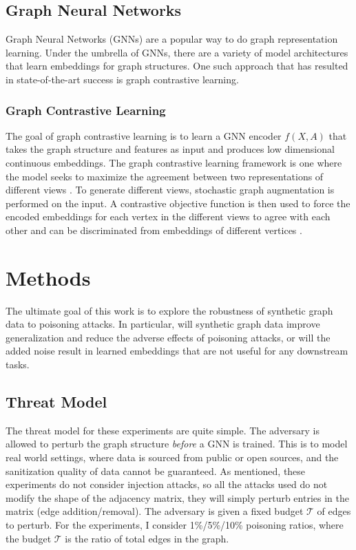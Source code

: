 \documentclass{article}
\begin{document}
\subsection{Graph Neural Networks}

Graph Neural Networks (GNNs) are a popular way to do graph representation learning. Under the umbrella of GNNs, there are a variety of model architectures that learn embeddings for graph structures. One such approach that has resulted in state-of-the-art success is graph contrastive learning.

\subsubsection{Graph Contrastive Learning}

The goal of graph contrastive learning is to learn a GNN encoder $f(X, A)$ that takes the graph structure and features as input and produces low dimensional continuous embeddings. The graph contrastive learning framework is one where the model seeks to maximize the agreement between two representations of different views \cite{zhu2020grace}. To generate different views, stochastic graph augmentation is performed on the input. A contrastive objective function is then used to force the encoded embeddings for each vertex in the different views to agree with each other and can be discriminated from embeddings of different vertices \cite{Zhu_2021_GCA}. 

\section{Methods}
\label{Methods}

The ultimate goal of this work is to explore the robustness of synthetic graph data to poisoning attacks. In particular, will synthetic graph data improve generalization and reduce the adverse effects of poisoning attacks, or will the added noise result in learned embeddings that are not useful for any downstream tasks.

\subsection{Threat Model}

The threat model for these experiments are quite simple. The adversary is allowed to perturb the graph structure \emph{before} a GNN is trained. This is to model real world settings, where data is sourced from public or open sources, and the sanitization quality of data cannot be guaranteed. As mentioned, these experiments do not consider injection attacks, so all the attacks used do not modify the shape of the adjacency matrix, they will simply perturb entries in the matrix (edge addition/removal). The adversary is given a fixed budget $\mathcal{T}$ of edges to perturb. For the experiments, I consider 1\%/5\%/10\% poisoning ratios, where the budget $\mathcal{T}$ is the ratio of total edges in the graph. 
\end{document}
